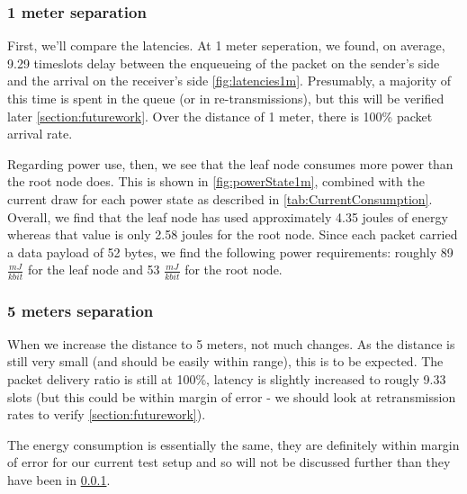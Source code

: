 \documentclass[conference]{IEEEtran}
\begin{document}
\subsubsection{1 meter separation}
\label{section:1metersep}
First, we'll compare the latencies. At 1 meter seperation, we found, on average, 9.29 timeslots delay between the enqueueing of the packet on the sender's side and the arrival on the receiver's side \ref{fig:latencies1m}. Presumably, a majority of this time is spent in the queue (or in re-transmissions), but this will be verified later \ref{section:futurework}.  Over the distance of 1 meter, there is 100\% packet arrival rate.

Regarding power use, then, we see that the leaf node consumes more power than the root node does. This is shown in \ref{fig:powerState1m}, combined with the current draw for each power state as described in \ref{tab:CurrentConsumption}. Overall, we find that the leaf node has used approximately 4.35 joules of energy whereas that value is only 2.58 joules for the root node. Since each packet carried a data payload of 52 bytes, we find the following power requirements: roughly 89 $\frac{mJ}{kbit}$ for the leaf node and  53 $\frac{mJ}{kbit}$ for the root node.



\subsubsection{5 meters separation}

When we increase the distance to 5 meters, not much changes. As the distance is still very small (and should be easily within range), this is to be expected. The packet delivery ratio is still at 100\%, latency is slightly increased to rougly 9.33 slots (but this could be within margin of error -  we should look at retransmission rates to verify \ref{section:futurework}). 

The energy consumption is essentially the same, they are definitely within margin of error for our current test setup and so will not be discussed further than they have been in \ref{section:1metersep}. 
\end{document}
